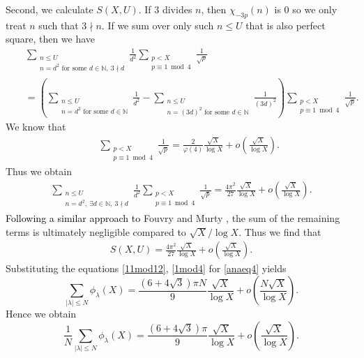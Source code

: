 \documentclass[a4paper, 11pt]{article}
\theoremstyle{plain}
\newcommand{\?}{\textcolor{red}{??}}
\newcommand{\lm}{\lambda}
\newcommand{\bN}{\mathbb{N}}
\begin{document}
Second, we calculate $S(X,U)$. If $3$ divides $n$, then ${\chi}_{-3p}(n)$ is $0$ so we only treat $n$ such that $3 \nmid n $. If we sum over only such $n \le U$  that is also perfect square, then we have
  \begin{eqnarray*}
   && \sum_{\substack{n \le U \\ n=d^2 \text{ for some } d \in \bN, \ 3 \nmid d}} \frac{1}{d^2} \sum_{\substack{p<X \\ p \equiv 1  \bmod 4}} \frac{1}{\sqrt{p}}\\ &&=\left(\sum_{\substack{n \le U \\ n=d^2 \text{ for some } d \in \bN}} \frac{1}{d^2} -\sum_{\substack{n \le U \\ n=(3d)^2 \text{ for some } d \in \bN}} \frac{1}{(3d)^2}\right)\sum_{\substack{p<X \\ p \equiv 1  \bmod 4}} \frac{1}{\sqrt{p}}.
    \end{eqnarray*}
    We know that 
    \begin{eqnarray*}
     && \sum_{\substack{p<X \\ p\equiv 1 \bmod 4}} \frac{1}{\sqrt{p}}=  \frac{2}{\varphi(4)} \frac{\sqrt{X}}{\log X} +o \left( \frac{\sqrt{X}}{\log X} \right).
    \end{eqnarray*}
    Thus we obtain 
    \begin{eqnarray*}
         \sum_{\substack{n \le U \\ n=d^2,\ \exists d \in \bN,\ 3 \nmid d }} \frac{1}{d^2} \sum_{\substack{p<X \\ p \equiv 1 \bmod 4 }} \frac{1}{\sqrt{p}}=\frac{{4\pi}^2}{27}\frac{\sqrt{X}}{\log X} +o \left( \frac{\sqrt{X}}{\log X} \right).
    \end{eqnarray*}
\textcolor{black}{Following a similar approach to} Fouvry and Murty \cite[p.92]{FM01}, the sum of the remaining terms is ultimately negligible compared to $\sqrt{X}/ \log X$.  Thus we find that
\begin{eqnarray}
\label{1mod4}
    S(X,U)=\frac{4{\pi}^2}{27}\frac{\sqrt{X}}{\log X} +o \left( \frac{\sqrt{X}}{\log X} \right).
\end{eqnarray}
Substituting the equations \eqref{11mod12}, \eqref{1mod4} for \eqref{anaeq4} yields 
\[
 \sum_{|\lm| \le N} {\phi}_{\lm}(X) =\frac{(6+4\sqrt{3})\pi N}{9}\frac{\sqrt{X}}{\log X} +o \left( \frac{N \sqrt{X}}{\log X} \right).
\]
Hence we obtain
\[
 \frac{1}{N}\sum_{|\lm| \le N} {\phi}_{\lm}(X) =\frac{(6+4\sqrt{3})\pi }{9} \frac{\sqrt{X}}{\log X} +o \left( \frac{ \sqrt{X}}{\log X} \right).
\]
\end{document}
